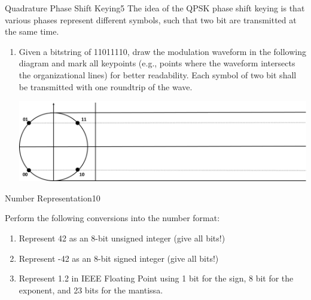 \documentclass[twoside,a4paper]{article}
\begin{document}
\clearpage
\begin{task}{Quadrature Phase Shift Keying}{5}{}
  The idea of the QPSK phase shift keying is that various phases represent different symbols, such that two bit are transmitted at the same time.

  \begin{enumerate}
  \item{Given a bitstring of 11011110, draw the modulation waveform in the following diagram and mark all keypoints (e.g., points where the waveform intersects the organizational lines) for better readability. Each symbol of two bit shall be transmitted with one roundtrip of the wave.

    \includegraphics[width=\textwidth]{gfx/qpsk.png}

  }
  
    \end{enumerate}
\end{task}

\clearpage



\begin{task}{Number Representation}{10}{}

  Perform the following conversions into the number format:

  \begin{enumerate}
  \item{Represent 42 as an 8-bit unsigned integer (give all bits!)\vspace*{3cm}}
  \item{Represent -42 as an 8-bit signed integer (give all bits!)\vspace*{3cm}}
  \item{Represent 1.2 in IEEE Floating Point using 1 bit for the sign, 8 bit for the exponent, and 23 bits for the
    mantissa.\vspace*{3cm}}
\end{enumerate}
\end{task}
\end{document}
